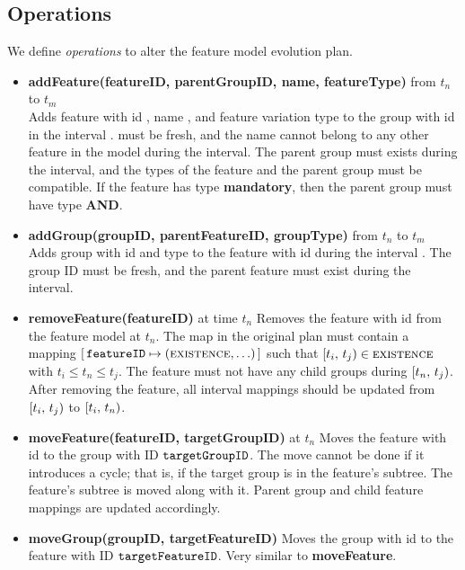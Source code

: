 \subsection{Operations}
\label{sub:operations}

We define \emph{operations} to alter the feature model evolution plan. 

\begin{itemize}
  \item \textbf{addFeature(featureID, parentGroupID, name, featureType)} from $t_n$ to $t_m$\\
    Adds feature with id , name , and feature variation type  to the group with id  in the interval .  must be fresh, and the name cannot belong to any other feature in the model during the interval. The parent group must exists during the interval, and the types of the feature and the parent group must be compatible. If the feature has type \textbf{mandatory}, then the parent group must have type \textbf{AND}.
  \item \textbf{addGroup(groupID, parentFeatureID, groupType)} from $t_n$ to $t_m$\\
    Adds group with id  and type  to the feature with id  during the interval . The group ID must be fresh, and the parent feature must exist during the interval. 
  \item \textbf{removeFeature(featureID)} at time $t_n$
    Removes the feature with id  from the feature model at $t_n$. The \features{} map in the original plan must contain a mapping $[\,\texttt{featureID} \mapsto (\textsc{existence}, \ldots)\,]$ such that $[t_i,\, t_j) \in \textsc{existence}$ with $ t_i \leq t_n \leq t_j$. The feature must not have any child groups during $[t_n,\, t_j)$. After removing the feature, all interval mappings should be updated from $[t_i,\, t_j)$ to $[t_i,\, t_n)$.
  \item \textbf{moveFeature(featureID, targetGroupID)} at $t_n$
    Moves the feature with id  to the group with ID $\texttt{targetGroupID}$. The move cannot be done if it introduces a cycle; that is, if the target group is in the feature's subtree. The feature's subtree is moved along with it. Parent group and child feature mappings are updated accordingly. 
  \item \textbf{moveGroup(groupID, targetFeatureID)} 
    Moves the group with id  to the feature with ID $\texttt{targetFeatureID}$. Very similar to \textbf{moveFeature}. 

\end{itemize}
